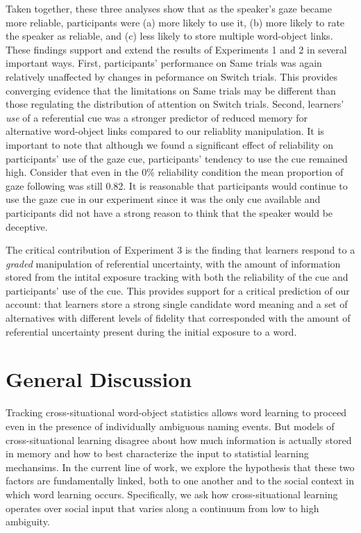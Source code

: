 \documentclass[a4paper,man,natbib]{apa6}
\begin{document}
Taken together, these three analyses show that as the speaker's gaze
became more reliable, participants were (a) more likely to use it, (b)
more likely to rate the speaker as reliable, and (c) less likely to
store multiple word-object links. These findings support and extend the
results of Experiments 1 and 2 in several important ways. First,
participants' performance on Same trials was again relatively unaffected
by changes in peformance on Switch trials. This provides converging
evidence that the limitations on Same trials may be different than those
regulating the distribution of attention on Switch trials. Second,
learners' \emph{use} of a referential cue was a stronger predictor of
reduced memory for alternative word-object links compared to our
reliablity manipulation. It is important to note that although we found
a significant effect of reliability on participants' use of the gaze
cue, participants' tendency to use the cue remained high. Consider that
even in the 0\% reliability condition the mean proportion of gaze
following was still 0.82. It is reasonable that participants would
continue to use the gaze cue in our experiment since it was the only cue
available and participants did not have a strong reason to think that
the speaker would be deceptive.

The critical contribution of Experiment 3 is the finding that learners
respond to a \emph{graded} manipulation of referential uncertainty, with
the amount of information stored from the intital exposure tracking with
both the reliability of the cue and participants' use of the cue. This
provides support for a critical prediction of our account: that learners
store a strong single candidate word meaning and a set of alternatives
with different levels of fidelity that corresponded with the amount of
referential uncertainty present during the initial exposure to a word.

\section{General Discussion}\label{general-discussion}

Tracking cross-situational word-object statistics allows word learning
to proceed even in the presence of individually ambiguous naming events.
But models of cross-situational learning disagree about how much
information is actually stored in memory and how to best characterize
the input to statistial learning mechansims. In the current line of
work, we explore the hypothesis that these two factors are fundamentally
linked, both to one another and to the social context in which word
learning occurs. Specifically, we ask how cross-situational learning
operates over social input that varies along a continuum from low to
high ambiguity.
\end{document}
